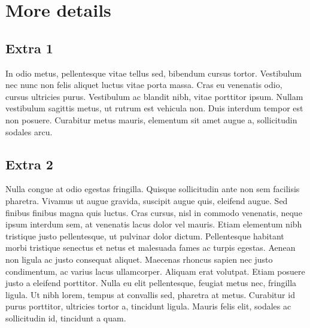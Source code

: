 \chapter{More details}

\section{Extra 1}
In odio metus, pellentesque vitae tellus sed, bibendum cursus tortor. Vestibulum nec nunc non felis aliquet luctus vitae porta massa. Cras eu venenatis odio, cursus ultricies purus. Vestibulum ac blandit nibh, vitae porttitor ipsum. Nullam vestibulum sagittis metus, ut rutrum est vehicula non. Duis interdum tempor est non posuere. Curabitur metus mauris, elementum sit amet augue a, sollicitudin sodales arcu.

\section{Extra 2}
Nulla congue at odio egestas fringilla. Quisque sollicitudin ante non sem facilisis pharetra. Vivamus ut augue gravida, suscipit augue quis, eleifend augue. Sed finibus finibus magna quis luctus. Cras cursus, nisl in commodo venenatis, neque ipsum interdum sem, at venenatis lacus dolor vel mauris. Etiam elementum nibh tristique justo pellentesque, ut pulvinar dolor dictum. Pellentesque habitant morbi tristique senectus et netus et malesuada fames ac turpis egestas. Aenean non ligula ac justo consequat aliquet. Maecenas rhoncus sapien nec justo condimentum, ac varius lacus ullamcorper. Aliquam erat volutpat. Etiam posuere justo a eleifend porttitor. Nulla eu elit pellentesque, feugiat metus nec, fringilla ligula. Ut nibh lorem, tempus at convallis sed, pharetra at metus. Curabitur id purus porttitor, ultricies tortor a, tincidunt ligula. Mauris felis elit, sodales ac sollicitudin id, tincidunt a quam.
